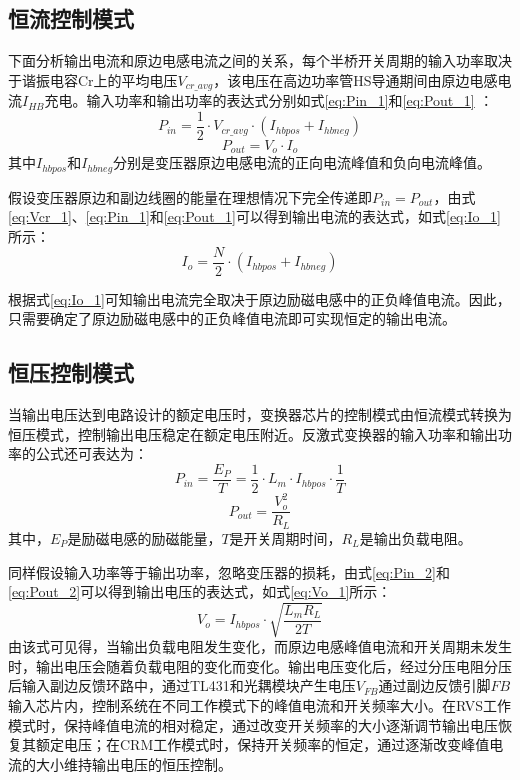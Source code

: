 \subsection{恒流控制模式}

下面分析输出电流和原边电感电流之间的关系，每个半桥开关周期的输入功率取决于谐振电容Cr上的平均电压$V_{cr\_avg}$，该电压在高边功率管HS导通期间由原边电感电流$I_{HB}$充电。输入功率和输出功率的表达式分别如式\eqref{eq:Pin_1}和\eqref{eq:Pout_1} ：
\begin{equation}
    \label{eq:Pin_1}
    P_{in}=\frac{1}{2} \cdot V_{cr\_avg} \cdot (I_{hbpos}+I_{hbneg})
\end{equation}
\begin{equation}
    \label{eq:Pout_1}
    P_{out}=V_o \cdot I_o
\end{equation}
其中$I_{hbpos}$和$I_{hbneg}$分别是变压器原边电感电流的正向电流峰值和负向电流峰值。

假设变压器原边和副边线圈的能量在理想情况下完全传递即$P_{in}=P_{out}$，由式\eqref{eq:Vcr_1}、\eqref{eq:Pin_1}和\eqref{eq:Pout_1}可以得到输出电流的表达式，如式\eqref{eq:Io_1}所示：
\begin{equation}
    \label{eq:Io_1}
    I_o=\frac{N}{2}\cdot(I_{hbpos} + I_{hbneg})
\end{equation}

根据式\eqref{eq:Io_1}可知输出电流完全取决于原边励磁电感中的正负峰值电流。因此，只需要确定了原边励磁电感中的正负峰值电流即可实现恒定的输出电流。

\subsection{恒压控制模式}

当输出电压达到电路设计的额定电压时，变换器芯片的控制模式由恒流模式转换为恒压模式，控制输出电压稳定在额定电压附近。反激式变换器的输入功率和输出功率的公式还可表达为：
\begin{equation}
    \label{eq:Pin_2}
    P_{in} = \frac{E_P}{T}=\frac{1}{2} \cdot L_m \cdot I_{hbpos} \cdot \frac{1}{T}
\end{equation}
\begin{equation}
    \label{eq:Pout_2}
    P_{out} = \frac{V_o^2}{R_L} 
\end{equation}
其中，$E_P$是励磁电感的励磁能量，$T$是开关周期时间，$R_L$是输出负载电阻。

同样假设输入功率等于输出功率，忽略变压器的损耗，由式\eqref{eq:Pin_2}和\eqref{eq:Pout_2}可以得到输出电压的表达式，如式\eqref{eq:Vo_1}所示：
\begin{equation}
    \label{eq:Vo_1}
    V_o = I_{hbpos} \cdot \sqrt{\frac{L_m R_L}{2T}}
\end{equation}
由该式可见得，当输出负载电阻发生变化，而原边电感峰值电流和开关周期未发生时，输出电压会随着负载电阻的变化而变化。输出电压变化后，经过分压电阻分压后输入副边反馈环路中，通过TL431和光耦模块产生电压$V_{FB}$通过副边反馈引脚$FB$输入芯片内，控制系统在不同工作模式下的峰值电流和开关频率大小。在RVS工作模式时，保持峰值电流的相对稳定，通过改变开关频率的大小逐渐调节输出电压恢复其额定电压；在CRM工作模式时，保持开关频率的恒定，通过逐渐改变峰值电流的大小维持输出电压的恒压控制。


